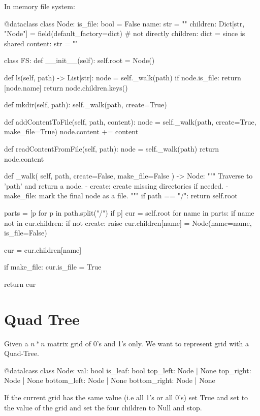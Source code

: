 In memory file system:
\begin{python}
@dataclass
class Node:
  is_file: bool = False
  name: str = ""
  children: Dict[str, "Node"] = field(default_factory=dict)
  # not directly children: dict = {} since {} is shared
  content: str = ""


class FS:
  def __init__(self):
    self.root = Node()

  def ls(self, path) -> List[str]:
    node = self._walk(path)
    if node.is_file:
      return [node.name]
    return node.children.keys()

  def mkdir(self, path):
    self._walk(path, create=True)

  def addContentToFile(self, path, content):
    node = self._walk(path, create=True, make_file=True)
    node.content += content

  def readContentFromFile(self, path):
    node = self._walk(path)
    return node.content

  def _walk(
    self, path, create=False, make_file=False
  ) -> Node:
    """
    Traverse to 'path' and return a node.
    - create: create missing directories if needed.
    - make_file: mark the final node as a file.
    """
    if path == "/":
      return self.root

    parts = [p for p in path.split("/") if p]
    cur = self.root
    for name in parts:
      if name not in cur.children:
        if not create:
          raise
        cur.children[name] = Node(name=name, is_file=False)

      cur = cur.children[name]

    if make_file:
      cur.is_file = True

    return cur
\end{python}

\section{Quad Tree}
Given a $n * n$ matrix grid of 0's and 1's only. We want to represent grid with a Quad-Tree. 
\begin{python}
@datalcass
class Node:
  val: bool
  is_leaf: bool
  top_left: Node | None
  top_right: Node | None
  bottom_left: Node | None
  bottom_right: Node | None
\end{python}

If the current grid has the same value (i.e all 1's or all 0's) set  True and set  to the value of the grid and set the four children to Null and stop.


